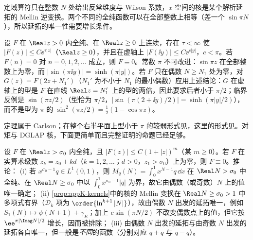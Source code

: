 定域算符只在整数 $N$ 处给出反常维度与 Wilson 系数，$x$ 空间的核是某个解析延拓的 Mellin 逆变换。两个不同的全纯函数可以在全部整数上相等（差一个 $\sin\pi N$），所以延拓的唯一性需要增长条件。

\begin{theorem}[Carlson 定理]\label{thm:appK-carlson}
设 $F$ 在 $\Real z>0$ 内全纯、在 $\Real z\ge0$ 上连续，存在 $\tau<\infty$ 使 $|F(z)|\le C\ee^{\tau|z|}$（$\Real z\ge0$），并且在虚轴上 $|F(\ii y)|\le C\ee^{c|y|}$，$c<\pi$。若 $F(n)=0$ 对 $n=0,1,2,\dots$ 成立，则 $F\equiv0$。常数 $\pi$ 不可改进：$\sin\pi z$ 在全部整数上为零，而 $|\sin(\pi\ii y)|=\sinh(\pi|y|)$。若 $F$ 只在偶数 $N\ge N_1$ 处为零，对 $G(z)=F(2z+N_1')$（$N_1'$ 为不小于 $N_1$ 的最小偶数）应用上述结论：$G$ 在虚轴上的型是 $F$ 在直线 $\Real z=N_1'$ 上的型的两倍，因此要求后者小于 $\pi/2$；临界反例是 $\sin(\pi z/2)$（型恰为 $\pi/2$，$|\sin(\pi(2+\ii y)/2)|=\sinh(\pi|y|/2)$），而不是型为 $\pi$ 的 $\sin^2(\pi z/2)=\frac12(1-\cos\pi z)$。
\end{theorem}

定理属于 Carlson\cite{Carlson1914}；在整个右半平面上型小于 $\pi$ 的较弱形式见\cite[第~5.81~节]{Titchmarsh1939}，这里的形式见\cite[定理~9.2.1]{Boas1954}。对矩与 DGLAP 核，下面更简单而且完整证明的命题已经足够。

\begin{proposition}[多项式有界条件下延拓的唯一性]\label{prop:appK-continuation}
设 $F$ 在 $\Real z>\sigma_0$ 内全纯，且 $|F(z)|\le C(1+|z|)^m$（某 $m\ge0$）。若 $F$ 在实算术级数 $z_k=z_0+kd$（$k=1,2,\dots$；$d>0$，$z_1>\sigma_0$）上为零，则 $F\equiv0$。推论：
(i) 若 $x^{\sigma_0-1}q\in L^1(0,1)$，则 $M_q(N)=\int_0^1x^{N-1}q\,\dd x$ 在 $\Real N>\sigma_0$ 中全纯、在 $\Real N\ge\sigma_0$ 中以 $\int_0^1x^{\sigma_0-1}|q|$ 为界，故它由偶数（或奇数）$N$ 上的值唯一确定；
(ii) \cref{prop:appK-kernels}中的核的 Mellin 变换在 $\Real N\ge\sigma_0>1$ 中多项式有界（$\mathcal D_k$ 项为 $\order{\ln^{k+1}|N|}$），故由偶数 $N$ 出发的延拓唯一，例如 $S_1(N)\mapsto\psi(N+1)+\gamma_E$；加上 $c\sin(\pi N/2)$ 不改变偶数点上的值，但它按 $\ee^{\pi|\Imag N|/2}$ 增长，因而被排除；
(iii) 由偶数 $N$ 出发的延拓与由奇数 $N$ 出发的延拓各自唯一，但一般是\emph{不同}的函数（分别对应 $q+\bar q$ 与 $q-\bar q$）。
\end{proposition}


